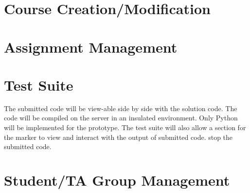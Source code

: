 \documentclass{article}
\begin{document}
\section{Course Creation/Modification}

\section{Assignment Management}

\section{Test Suite}
The submitted code will be view-able side by side with the solution code.  The code will be compiled on the server in an insulated environment.  Only Python will be implemented for the prototype.  The test suite will also allow a section for the marker to view and interact with the output of submitted code.
stop the submitted code.

\section{Student/TA Group Management}
\end{document}
